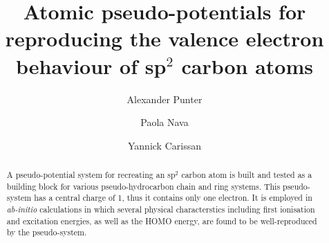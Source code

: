 \documentclass[aip]{revtex4-1}
\begin{document}
\title{Atomic pseudo-potentials for reproducing the valence electron behaviour of sp$^2$ carbon atoms}
\author{Alexander Punter}
\author{Paola Nava}
\author{Yannick Carissan}

\begin{abstract}
A pseudo-potential system for recreating an sp\(^{2}\) carbon atom is built 
and tested as a building block for various pseudo-hydrocarbon chain and ring systems.  
This pseudo-system has a central charge of 1, thus it contains only one
electron. It is employed in \textsl{ab-initio} calculations in which several physical characterstics
including first ionisation and excitation energies, as well as the HOMO energy, 
are found to be well-reproduced by the pseudo-system.
\end{abstract}
\maketitle

\clearpage



\begin{figure}[h]
\centering
\colorbox{background-color}{
}
\end{figure}
\end{document}
